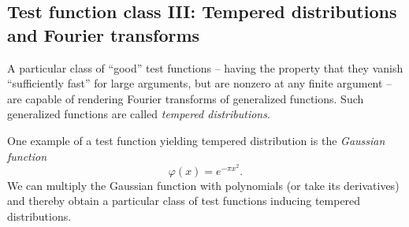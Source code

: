 \subsection{Test function class III: Tempered distributions and Fourier transforms}

A particular class of ``good'' test functions -- having the property that they vanish
``sufficiently fast'' for large arguments, but are nonzero at any finite argument --
are capable of rendering Fourier transforms of generalized functions. Such generalized functions are called
{\em tempered distributions}.

One example of a test function yielding tempered distribution is the {\em Gaussian function}
\begin{equation}
\varphi (x)= e^{-\pi x^2}.
\label{2012-m-ch-di-td}
\end{equation}
We can multiply the Gaussian function with polynomials (or take its derivatives) and thereby obtain a particular class of test functions
inducing tempered distributions.


